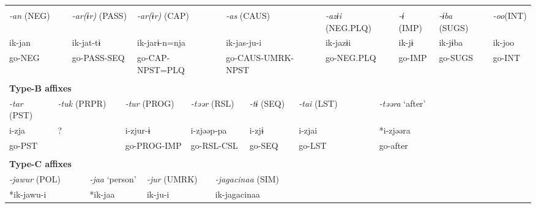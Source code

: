 \tabletail{}
\tablelasttail{}
\begin{tabularx}{\textwidth}{XXXXXXXXXXXXXXXXXXXX}
\lsptoprule
\multicolumn{20}{X}{{\bfseries Type-A affixes}}\\
\multicolumn{2}{X}{{ \textit{{}-an} (NEG)}} & \multicolumn{4}{X}{{ \textit{{}-ar(ɨr)} (PASS)}} & \multicolumn{5}{X}{{ \textit{{}-ar(ɨr)} (CAP)}} & \multicolumn{4}{X}{{ \textit{{}-as} (CAUS)}} & \multicolumn{2}{X}{{ \textit{{}-azɨi} (NEG.PLQ)}} & { \textit{{}-ɨ} (IMP)} & { \textit{{}-ɨba} (SUGS)} & { \textit{{}-oo}(INT)}\\
\multicolumn{2}{X}{{ ik-jan}} & \multicolumn{4}{X}{{ ik-jat-tɨ}} & \multicolumn{5}{X}{{ ik-jarɨ-n=nja}} & \multicolumn{4}{X}{{ ik-jas-ju-i}} & \multicolumn{2}{X}{{ ik-jazɨi}} & { ik-jɨ} & { ik-jɨba} & { ik-joo}\\
\multicolumn{2}{X}{go-NEG} & \multicolumn{4}{X}{go-PASS-SEQ} & \multicolumn{5}{X}{go-CAP-NPST=PLQ} & \multicolumn{4}{X}{go-CAUS-UMRK-NPST} & \multicolumn{2}{X}{go-NEG.PLQ} & go-IMP & go-SUGS & go-INT\\
\multicolumn{20}{X}{}\\
\multicolumn{20}{X}{{\bfseries Type-B affixes}}\\
{ \textit{{}-tar} (PST)} & \multicolumn{4}{X}{{ \textit{{}-tuk} (PRPR)}} & \multicolumn{4}{X}{{ \textit{{}-tur} (PROG)}} & \multicolumn{4}{X}{{ \textit{{}-təər} (RSL)}} & { \textit{{}-tɨ} (SEQ)} & \multicolumn{2}{X}{{ \textit{{}-tai} (LST)}} & \multicolumn{4}{X}{{ \textit{{}-təəra} ‘after’}}\\
{ i-zja} & \multicolumn{4}{X}{{ ?}} & \multicolumn{4}{X}{{ i-zjur-ɨ}} & \multicolumn{4}{X}{{ i-zjəəp-pa}} & { i-zjɨ} & \multicolumn{2}{X}{{ i-zjai}} & \multicolumn{4}{X}{{ *i-zjəəra}}\\
go-PST & \multicolumn{4}{X}{} & \multicolumn{4}{X}{go-PROG-IMP} & \multicolumn{4}{X}{go-RSL-CSL} & go-SEQ & \multicolumn{2}{X}{go-LST} & \multicolumn{4}{X}{{ go-after}}\\
& \multicolumn{4}{X}{} & \multicolumn{4}{X}{} & \multicolumn{4}{X}{} &  & \multicolumn{2}{X}{} & \multicolumn{4}{X}{}\\
\multicolumn{20}{X}{{\bfseries Type-C affixes}}\\
\multicolumn{3}{X}{{ \textit{{}-jawur} (POL)}} & \multicolumn{4}{X}{{ \textit{{}-jaa} ‘person’}} & \multicolumn{3}{X}{{ \textit{{}-jur} (UMRK)}} & \multicolumn{10}{X}{{ \textit{{}-jagacinaa} (SIM)}}\\
\multicolumn{3}{X}{{ *ik-jawu-i}} & \multicolumn{4}{X}{*ik-jaa} & \multicolumn{3}{X}{ik-ju-i} & \multicolumn{10}{X}{{ ik-jagacinaa}}\\

\end{tabularx}
